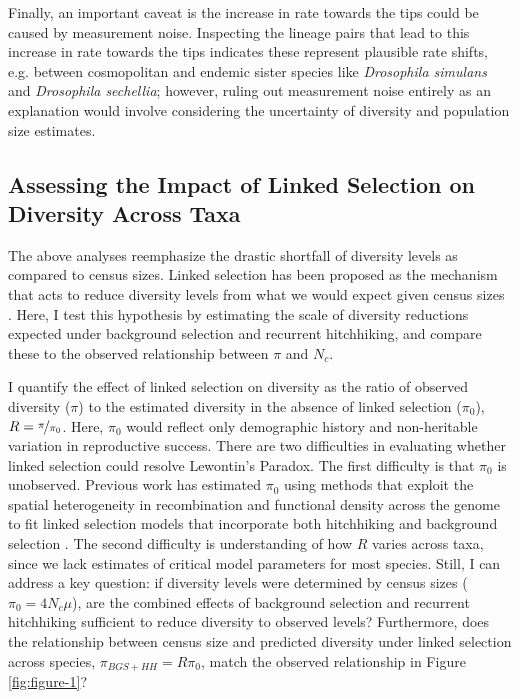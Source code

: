 \documentclass[11pt]{article}
\begin{document}
Finally, an important caveat is the increase in rate towards the tips could be
caused by measurement noise. Inspecting the lineage pairs that lead to this
increase in rate towards the tips indicates these represent plausible rate
shifts, e.g. between cosmopolitan and endemic sister species like
\emph{Drosophila simulans} and \emph{Drosophila sechellia}; however, ruling out
measurement noise entirely as an explanation would involve considering the
uncertainty of diversity and population size estimates.

\subsection*{Assessing the Impact of Linked Selection on Diversity Across Taxa}

The above analyses reemphasize the drastic shortfall of diversity levels as
compared to census sizes. Linked selection has been proposed as the mechanism
that acts to reduce diversity levels from what we would expect given census
sizes \parencite{Maynard_Smith1974-zr,Gillespie2000-mh,Corbett-Detig2015-gt}.
Here, I test this hypothesis by estimating the scale of diversity reductions
expected under background selection and recurrent hitchhiking, and compare
these to the observed relationship between $\pi$ and $N_c$. 

I quantify the effect of linked selection on diversity as the ratio of observed
diversity ($\pi$) to the estimated diversity in the absence of linked selection
($\pi_0$), $R = \nicefrac{\pi}{\pi_0}$. Here, $\pi_0$ would reflect only
demographic history and non-heritable variation in reproductive success. There
are two difficulties in evaluating whether linked selection could resolve
Lewontin's Paradox. The first difficulty is that $\pi_0$ is unobserved.
Previous work has estimated $\pi_0$ using methods that exploit the spatial
heterogeneity in recombination and functional density across the genome to fit
linked selection models that incorporate both hitchhiking and background
selection \parencite{Elyashiv2016-vt,Corbett-Detig2015-gt}. The second
difficulty is understanding of how $R$ varies across taxa, since we lack
estimates of critical model parameters for most species. Still, I can address a
key question: if diversity levels were determined by census sizes ($\pi_0 =
4N_c \mu$), are the combined effects of background selection and recurrent
hitchhiking sufficient to reduce diversity to observed levels? Furthermore,
does the relationship between census size and predicted diversity under linked
selection across species, $\pi_{BGS+HH} = R \pi_0$, match the observed
relationship in Figure \ref{fig:figure-1}? 
\end{document}
